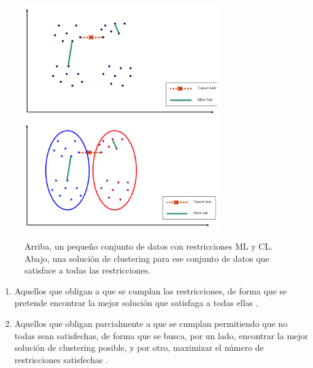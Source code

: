 \begin{figure}
	\centering
	\includegraphics[width=0.75\textwidth]{Images/const_clust}
	\includegraphics[width=0.75\textwidth]{Images/const_clust_sol}
	\caption[Arriba, un pequeño conjunto de datos con restricciones ML y CL. Abajo, una solución de clustering para ese conjunto de datos que satisface a todas las restricciones.]{Arriba, un pequeño conjunto de datos con restricciones ML y CL. Abajo, una solución de clustering para ese conjunto de datos que satisface a todas las restricciones. \cite{davidson2007survey}}
	\label{fig:const_clust_sol}
\end{figure}


\begin{enumerate}
	\item Aquellos que obligan a que se cumplan las restricciones, de forma que se pretende encontrar la mejor solución que satisfaga a todas ellas \cite{wagstaff2001constrained} \cite{davidson2005hierarchical}.
	\item Aquellos que obligan parcialmente a que se cumplan permitiendo que no todas sean satisfechas, de forma que se busca, por un lado, encontrar la mejor solución de clustering posible, y por otro, maximizar el número de restricciones satisfechas \cite{basu2004active} \cite{segal2003discovering} \cite{davidson2005clustering} \cite{law2005model}.
\end{enumerate}


